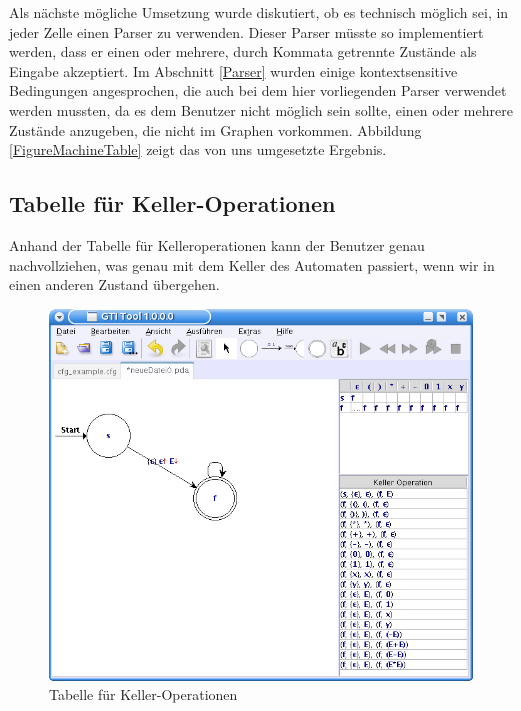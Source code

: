 Als nächste mögliche Umsetzung wurde diskutiert, ob es technisch möglich sei,
in jeder Zelle einen Parser zu verwenden. Dieser Parser müsste so implementiert
werden, dass er einen oder mehrere, durch Kommata getrennte Zustände als Eingabe
akzeptiert. Im Abschnitt \ref{Parser} wurden einige kontextsensitive Bedingungen
angesprochen, die auch bei dem hier vorliegenden Parser verwendet werden
mussten, da es dem Benutzer nicht möglich sein sollte, einen oder mehrere
Zustände anzugeben, die nicht im Graphen vorkommen. Abbildung
\ref{FigureMachineTable} zeigt das von uns umgesetzte Ergebnis.\vspace{10pt}


\subsection{Tabelle für Keller-Operationen}\label{TablesPDA}

Anhand der Tabelle für Kelleroperationen kann der Benutzer genau
nachvollziehen, was genau mit dem Keller des Automaten passiert, wenn wir
in einen anderen Zustand übergehen.\vspace{10pt}

\begin{figure}[h!]
\begin{center}
\includegraphics[width=12cm]{../images/stack_operation_table.png}
\caption{Tabelle für Keller-Operationen}
\label{FigureStackOperationTable}
\end{center}
\end{figure}
\vspace{10pt}

